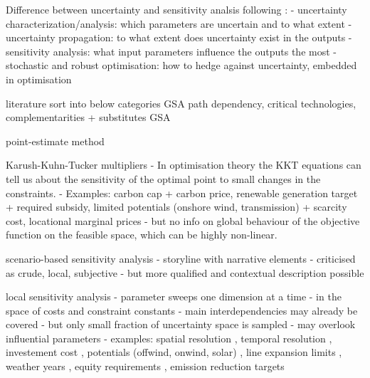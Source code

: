 Difference between uncertainty and sensitivity analsis following \cite{usher_value_2016}:
- uncertainty characterization/analysis: which parameters are uncertain and to what extent
- uncertainty propagation: to what extent does uncertainty exist in the outputs
- sensitivity analysis: what input parameters influence the outputs the most
- stochastic and robust optimisation: how to hedge against uncertainty, embedded in optimisation


literature sort into below categories
\cite{fais_impact_2016} GSA path dependency, critical technologies, complementarities + substitutes
\cite{mavromatidis_uncertainty_2018} GSA
\cite{pilpola_analyzing_2020}
\cite{schyska_sensitivity_2020}
\cite{soroudi_decision_2013}
\cite{lopion_cost_2019}
\cite{moret_robust_2016}

point-estimate method \cite{soroudi_decision_2013}

Karush-Kuhn-Tucker multipliers
- In optimisation theory the KKT equations can tell us about the sensitivity of the optimal point to small changes in the constraints.
- Examples: carbon cap + carbon price, renewable generation target + required subsidy, limited potentials (onshore wind, transmission) + scarcity cost, locational marginal prices
- but no info on global behaviour of the objective function on the feasible space, which can be highly non-linear.

scenario-based sensitivity analysis
- storyline with narrative elements \cite{DeCarolis2017}
- criticised as crude, local, subjective \cite{usher_value_2015}
- but more qualified and contextual description possible

local sensitivity analysis
- parameter sweeps one dimension at a time \cite{schlachtberger_cost_2018}
- in the space of costs and constraint constants
- main interdependencies may already be covered \cite{schlachtberger_cost_2018}
- but only small fraction of uncertainty space is sampled
- may overlook influential parameters \cite{pizarro-alonso_uncertainties_2019}
- examples: spatial resolution \cite{hoersch_spatial_2017}, temporal resolution \cite{kotzur_tsa_2018}, investement cost \cite{shirizadeh_how_2019}, potentials (offwind, onwind, solar) \cite{schlachtberger_cost_2018}, line expansion limits \cite{schlachtberger_benefits_2017}, weather years \cite{bloomfield_2021}, equity requirements \cite{sasse_regional_2020,sasse_distributional_2019}, emission reduction targets

